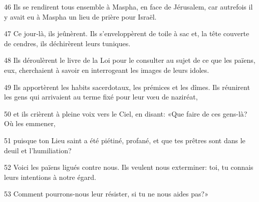 
46 Ils se rendirent tous ensemble à Maspha, en face de Jérusalem, car autrefois il y avait eu à Maspha un lieu de prière pour Israël.

47 Ce jour-là, ils jeûnèrent. Ils s’enveloppèrent de toile à sac et, la tête couverte de cendres, ils déchirèrent leurs tuniques.

48 Ils déroulèrent le livre de la Loi pour le consulter au sujet de ce que les païens, eux, cherchaient à savoir en interrogeant les images de leurs idoles.

49 Ils apportèrent les habits sacerdotaux, les prémices et les dîmes. Ils réunirent les gens qui arrivaient au terme fixé pour leur vœu de naziréat,

50 et ils crièrent à pleine voix vers le Ciel, en disant: «Que faire de ces gens-là? Où les emmener,

51 puisque ton Lieu saint a été piétiné, profané, et que tes prêtres sont dans le deuil et l’humiliation?

52 Voici les païens ligués contre nous. Ils veulent nous exterminer: toi, tu connais leurs intentions à notre égard.

53 Comment pourrons-nous leur résister, si tu ne nous aides pas?»
